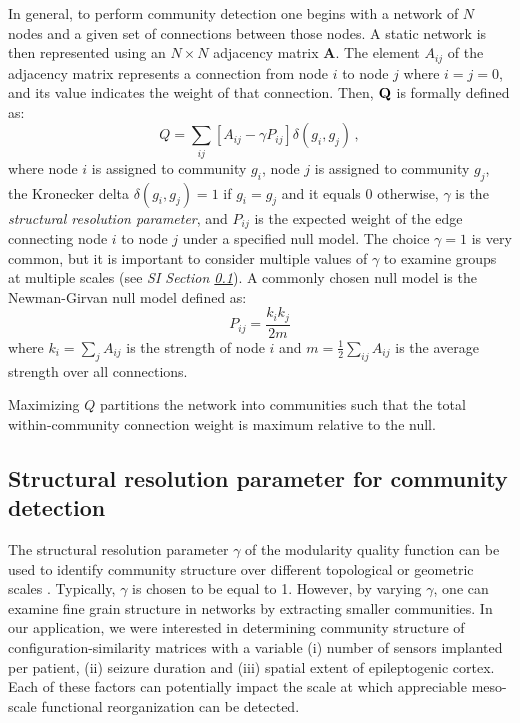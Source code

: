 In general, to perform community detection one begins with a network of $N$ nodes and a given set of connections between those nodes. A static network is then represented using an $N \times N$ adjacency matrix $\mathbf{A}$. The element $A_{ij}$ of the adjacency matrix represents a connection from node $i$ to node $j$ where $i=j=0$, and its value indicates the weight of that connection. Then, $\mathbf{\displaystyle Q}$ is formally defined as:
\begin{equation}\label{modopt}
	Q = \sum_{ij} [A_{ij} - \gamma P_{ij}] \delta(g_{i},g_{j})\,,
\end{equation}
where node $i$ is assigned to community $g_{i}$, node $j$ is assigned to community $g_{j}$, the Kronecker delta $\delta(g_{i},g_{j})=1$ if $g_{i} = g_{j}$ and it equals $0$ otherwise, $\gamma$ is the \emph{structural resolution parameter}, and $P_{ij}$ is the expected weight of the edge connecting node $i$ to node $j$ under a specified null model. The choice $\gamma = 1$ is very common, but it is important to consider multiple values of $\gamma$ to examine groups at multiple scales (see \textit{SI Section \ref{subsec:structres}}). A commonly chosen null model is the Newman-Girvan null model \cite{porter2009communities, fortunato2010community, newman2004finding, newman2006modularity} defined as:
\begin{equation}\label{newgirv}
    P_{ij} = \frac{k_i k_j}{2m}
\end{equation}
where $k_i=\sum_j A_{ij}$ is the strength of node $i$ and $m=\frac{1}{2}\sum_{ij}A_{ij}$ is the average strength over all connections. 

Maximizing $Q$ partitions the network into communities such that the total within-community connection weight is maximum relative to the null.

\subsection{Structural resolution parameter for community detection}
\label{subsec:structres}
The structural resolution parameter $\gamma$ of the modularity quality function can be used to identify community structure over different topological or geometric scales \cite{reichardt2006statistical, fortunato2007resolution, porter2009communities, mucha2010community, bassett2013robust}. Typically, $\gamma$ is chosen to be equal to 1. However, by varying $\gamma$, one can examine fine grain structure in networks by extracting smaller communities. In our application, we were interested in determining community structure of configuration-similarity matrices with a variable (i) number of sensors implanted per patient, (ii) seizure duration and (iii) spatial extent of epileptogenic cortex. Each of these factors can potentially impact the scale at which appreciable meso-scale functional reorganization can be detected.

